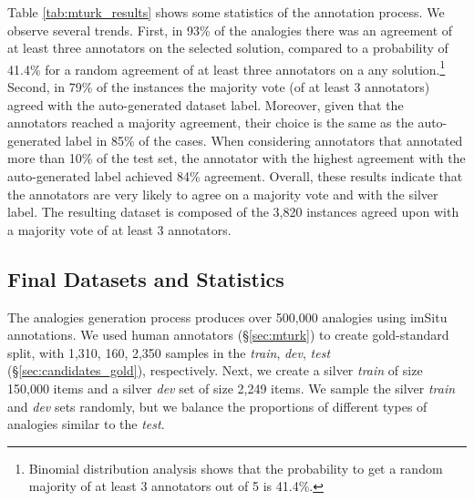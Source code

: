 \documentclass[letterpaper]{article} \usepackage{aaai23}  \usepackage{times}  \usepackage{helvet}  \usepackage{courier}  \usepackage[hyphens]{url}  \usepackage{graphicx} \urlstyle{rm} \def\UrlFont{\rm}  \usepackage{natbib}  \usepackage{caption} \frenchspacing  \setlength{\pdfpagewidth}{8.5in}  \setlength{\pdfpageheight}{11in}  \usepackage{algorithm}
\begin{document}
Table \ref{tab:mturk_results} shows some statistics of the annotation process. We observe several trends. First, in 93\% of the analogies there was an agreement of at least three annotators on the selected solution, compared to a probability of 41.4\% for a random agreement of at least three annotators on a any solution.\footnote{Binomial distribution analysis shows that the probability to get a random majority of at least 3 annotators out of 5 is 41.4\%.} Second, in 79\% of the instances the majority vote (of at least 3 annotators) agreed with the auto-generated dataset label. Moreover, given that the annotators reached a majority agreement, their choice is the same as the auto-generated label in 85\% of the cases. When considering annotators that annotated more than 10\% of the test set, the annotator with the highest agreement with the auto-generated label achieved 84\% agreement. Overall, these results indicate that the annotators are very likely to agree on a majority vote and with the silver label. 
The resulting dataset is composed of the 3,820 instances agreed upon with a majority vote of at least 3 annotators.

\begin{table}[tb!]
\center
\caption{AMT annotation results. The annotators are very likely to select the same candidate as the analogy answer, and with high agreement with the auto-generated label.}
\label{tab:mturk_results}
\end{table}
\subsection{Final Datasets and Statistics}
\label{sec:statistics}

The analogies generation process produces over 500,000 analogies using imSitu annotations. We used human annotators (\S\ref{sec:mturk}) to create gold-standard split, with 1,310, 160, 2,350 samples in the \emph{train}, \emph{dev}, \emph{test} (\S\ref{sec:candidates_gold}), respectively. Next, we create a silver \emph{train} of size 150,000 items and a silver \emph{dev} set of size 2,249 items. We sample the silver \emph{train} and \emph{dev} sets randomly, but we balance the proportions of different types of analogies similar to the \emph{test}.
\end{document}
